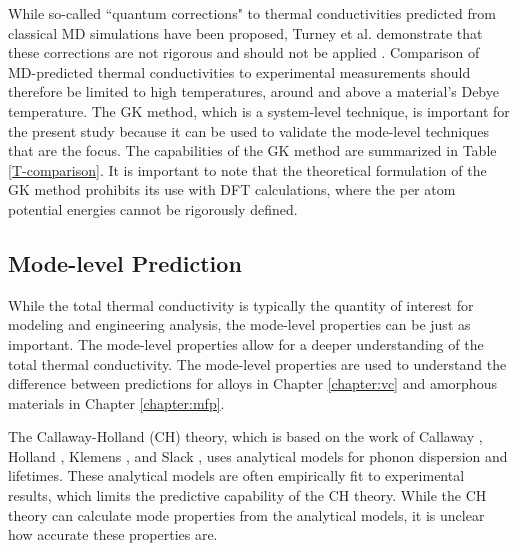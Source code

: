While so-called ``quantum corrections" to 
thermal conductivities predicted from classical MD simulations have been 
proposed, Turney et al. demonstrate that these corrections are not 
rigorous and should not be applied \cite{turney_assessing_2009}. 
Comparison of MD-predicted thermal conductivities to experimental 
measurements should 
therefore be limited to high temperatures, around and above a material's 
Debye temperature. The GK method, which is a system-level technique, 
is important for the present study because it can be used to validate 
the mode-level techniques that are the focus. The capabilities 
of the GK method are summarized in Table \ref{T-comparison}. It is 
important to note that the theoretical formulation of the GK method 
prohibits its use with DFT calculations, where the per atom potential 
energies cannot be rigorously defined.\cite{martin_electronic_2004}

\subsection{\label{S-kbottomup}Mode-level Prediction}

While the total thermal conductivity is typically the quantity of 
interest for modeling and engineering analysis, the mode-level 
properties can be just as important. The mode-level properties 
allow for a deeper understanding of the total thermal conductivity.  
The mode-level properties are used to understand the difference 
between predictions for alloys in Chapter \ref{chapter:vc} 
and amorphous materials in Chapter \ref{chapter:mfp}. 

The Callaway-Holland (CH) theory, which is based on the work of 
Callaway \cite{callaway_model_1959}, Holland \cite{holland_analysis_1963},
Klemens \cite{klemens_scattering_1955}, 
and Slack \cite{slack_thermal_1979}, uses analytical models for phonon 
dispersion and lifetimes. These analytical models are often empirically 
fit to experimental results, which limits the predictive capability of 
the CH theory. While the CH theory can calculate mode properties 
from the analytical models, it is unclear how accurate these properties 
are.\cite{chung_role_2004}

